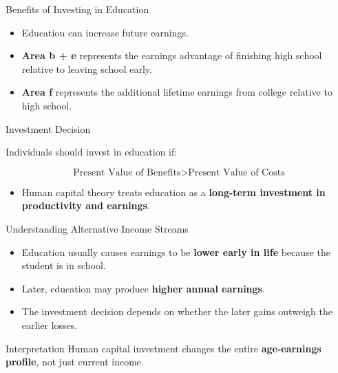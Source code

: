 \documentclass[aspectratio=169]{beamer}
\begin{document}
\begin{frame}{Benefits of Investing in Education}
\transfade

\begin{itemize}

\item Education can increase future earnings.

\item \textbf{Area b + e} represents the earnings advantage of finishing high school relative to leaving school early.

\item \textbf{Area f} represents the additional lifetime earnings from college relative to high school.



\end{itemize}

\begin{block}{Investment Decision}

Individuals should invest in education if:

\[
\text{Present Value of Benefits} > \text{Present Value of Costs}
\]

\end{block}

\begin{itemize}

\item Human capital theory treats education as a \textbf{long-term investment in productivity and earnings}.

\end{itemize}

\end{frame}



\begin{frame}{Understanding Alternative Income Streams}
\transfade
\begin{itemize}
  \item Education usually causes earnings to be \textbf{lower early in life} because the student is in school.
  \item Later, education may produce \textbf{higher annual earnings}.
  \item The investment decision depends on whether the later gains outweigh the earlier losses.
\end{itemize}

\begin{block}{Interpretation}
Human capital investment changes the entire \textbf{age-earnings profile}, not just current income.
\end{block}
\end{frame}
\end{document}
